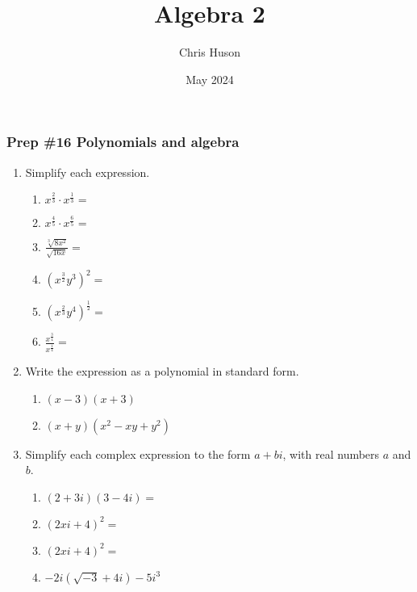 \documentclass[12pt, twoside]{article}
\title{Algebra 2}
\author{Chris Huson}
\date{May 2024}
\begin{document}
\subsubsection*{Prep \#16 Polynomials and algebra}
\begin{enumerate}[itemsep=0.5cm]

\item Simplify each expression.
    \begin{multicols}{2}
    \begin{enumerate}[itemsep=0.75cm]
        \item $\displaystyle x^{\frac{2}{3}} \cdot x^{\frac{1}{3}} =$
        \item $\displaystyle x^{\frac{4}{5}} \cdot x^{\frac{6}{5}} =$
        \item $\displaystyle \frac{\sqrt[3]{8x^2}}{\sqrt{16x}} = $
        \item $\displaystyle (x^{\frac{3}{2}}y^3)^2 =$
        \item $\displaystyle (x^{\frac{2}{3}}y^4)^{\frac{1}{2}} =$
        \item $\displaystyle \frac{x^{\frac{3}{4}}}{x^{\frac{1}{4}}} =$
    \end{enumerate}
    \end{multicols} \vspace{0.5cm}

\item Write the expression as a polynomial in standard form.
    \begin{multicols}{2}
    \begin{enumerate}
        \item $(x-3)(x+3)$
        \item $(x+y)(x^2-xy+y^2)$
    \end{enumerate}
    \end{multicols} \vspace{3cm}

\item Simplify each complex expression to the form $a+bi$, with real numbers $a$ and $b$.
    \begin{multicols}{2}
    \begin{enumerate}[itemsep=4cm]
        \item $(2+3i)(3-4i)=$
        \item $(2xi+4)^2=$
        \item $(2xi+4)^2=$
        \item $-2i(\sqrt{-3}+4i)-5i^3$
    \end{enumerate}
    \end{multicols} \vspace{3cm}


\end{enumerate}
\end{document}
